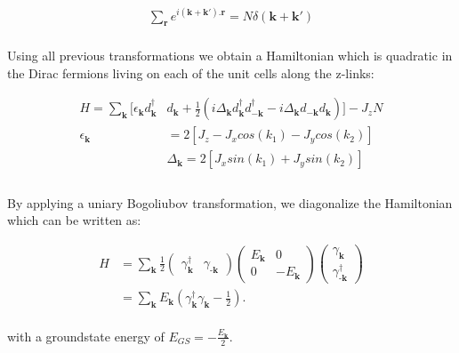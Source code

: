 \documentclass{article}
\begin{document}
\begin{equation}\label{eq:15}
	\begin{aligned}
		\sum_\textbf{r} e^{i(\textbf{k}+\textbf{k}').\textbf{r}} = N\delta(\textbf{k} + \textbf{k}')
	\end{aligned}
\end{equation}\\

Using all previous transformations we obtain a Hamiltonian which is quadratic in the Dirac fermions living on each of the unit cells along the z-links:

\begin{equation}\label{eq:16}
	\begin{aligned}
		H = \sum_\textbf{k}[\epsilon_\textbf{k}d^\dagger_{\textbf{k}}&d_{\textbf{k}} + \frac{1}{2}(i\Delta_\textbf{k}d^\dagger_{\textbf{k}}d^\dagger_{-\textbf{k}}-i\Delta_\textbf{k}d_{-\textbf{k}}d_{\textbf{k}})]-J_zN\\
		\epsilon_\textbf{k} &= 2[J_z-J_xcos(k_1)-J_ycos(k_2)]\\
		&\Delta_\textbf{k} = 2[J_xsin(k_1)+J_ysin(k_2)]\\
	\end{aligned}
\end{equation}\\

\noindent By applying a uniary Bogoliubov transformation, we diagonalize the Hamiltonian which can be written as:

\begin{equation}\label{eq:17}
	\begin{aligned}
		H &= \sum_\textbf{k} \frac{1}{2} 
		\begin{pmatrix}
			\gamma^\dagger_\textbf{k} & \gamma_{\textbf{-k}}
		\end{pmatrix}
		\begin{pmatrix}
			E_\textbf{k} & 0\\
			0 & -E_\textbf{k}
		\end{pmatrix}
		\begin{pmatrix} \gamma_\textbf{k} \\ \gamma^\dagger_{\textbf{-k}} \end{pmatrix}\\
		&= \sum_\textbf{k}E_\textbf{k}(\gamma^\dagger_\textbf{k}\gamma_{\textbf{k}}-\frac{1}{2}).
	\end{aligned}
\end{equation}\\

\noindent with a groundstate energy of $E_{GS} = -\frac{E_\textbf{k}}{2}$.
\end{document}
